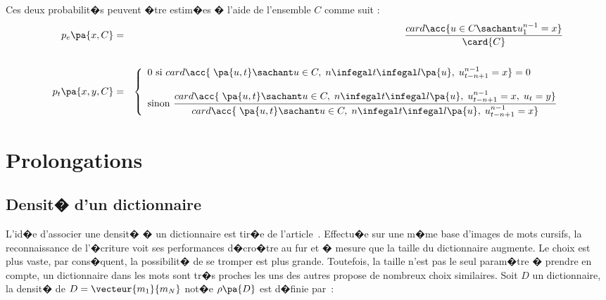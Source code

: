 Ces deux probabilit�s peuvent �tre estim�es � l'aide de l'ensemble $C$ comme suit :
    \begin{eqnarray*}
    p_e\pa{x,C}     &=&     \dfrac  {  card \acc {u \in C \sachant u_1^{n-1} = x }}   { \card{C}} \\ \\
    p_t\pa{x,y,C}   &=&     \left\{\begin{array}{l}
                            0 \text{ si } card \acc { \; \pa{u,t} \sachant u \in C, \; 
                                            n \infegal t \infegal l\pa{u}, \; u_{t-n+1}^{n-1} = x} = 0 \\ \\
                            \text{sinon }
                            \dfrac  {  card \acc { \; \pa{u,t} \sachant u \in C, \; 
                                            n \infegal t \infegal l\pa{u}, \; u_{t-n+1}^{n-1} = x, \; u_t = y}}
                                    {  card \acc { \; \pa{u,t} \sachant u \in C, \; n \infegal t \infegal 
                                            l\pa{u}, \; u_{t-n+1}^{n-1} = x}}
                            \end{array}
                            \right.
    \end{eqnarray*}















\section{Prolongations}





\subsection{Densit� d'un dictionnaire}


L'id�e d'associer une densit� � un dictionnaire est tir�e de l'article~. Effectu�e sur une m�me base d'images de mots cursifs, la reconnaissance de l'�criture voit ses performances d�cro�tre au fur et � mesure que la taille du dictionnaire augmente. Le choix est plus vaste, par cons�quent, la possibilit� de se tromper est plus grande. Toutefois, la taille n'est pas le seul param�tre � prendre en compte, un dictionnaire dans les mots sont tr�s proches les uns des autres propose de nombreux choix similaires. Soit $D$ un dictionnaire, la densit� de $D=\vecteur{m_1}{m_N}$ not�e $\rho\pa{D}$ est d�finie par~:

